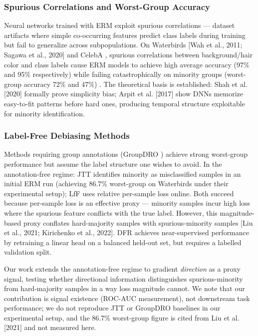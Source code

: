 
\subsubsection{Spurious Correlations and Worst-Group Accuracy}

Neural networks trained with ERM exploit spurious correlations --- dataset artifacts where simple co-occurring features predict class labels during training but fail to generalize across subpopulations. On Waterbirds [Wah et al., 2011; Sagawa et al., 2020] and CelebA \citep{Liu2015}, spurious correlations between background/hair color and class labels cause ERM models to achieve high average accuracy (97\% and 95\% respectively) while failing catastrophically on minority groups (worst-group accuracy 72\% and 47\%) \citep{Sagawa2020}. The theoretical basis is established: Shah et al. [2020] formally prove simplicity bias; Arpit et al. [2017] show DNNs memorize easy-to-fit patterns before hard ones, producing temporal structure exploitable for minority identification.

\subsubsection{Label-Free Debiasing Methods}

Methods requiring group annotations (GroupDRO \citep{Sagawa2020}) achieve strong worst-group performance but assume the label structure one wishes to avoid. In the annotation-free regime: JTT \citep{Liu2021} identifies minority as misclassified samples in an initial ERM run (achieving 86.7\% worst-group on Waterbirds under their experimental setup); LfF \citep{Nam2020} uses relative per-sample loss online. Both succeed because per-sample loss is an effective proxy --- minority samples incur high loss where the spurious feature conflicts with the true label. However, this magnitude-based proxy conflates hard-majority samples with spurious-minority samples [Liu et al., 2021; Kirichenko et al., 2022]. DFR \citep{Kirichenko2022} achieves near-supervised performance by retraining a linear head on a balanced held-out set, but requires a labelled validation split.

Our work extends the annotation-free regime to gradient \textit{direction} as a proxy signal, testing whether directional information distinguishes spurious-minority from hard-majority samples in a way loss magnitude cannot. We note that our contribution is signal existence (ROC-AUC measurement), not downstream task performance; we do not reproduce JTT or GroupDRO baselines in our experimental setup, and the 86.7\% worst-group figure is cited from Liu et al. [2021] and not measured here.

